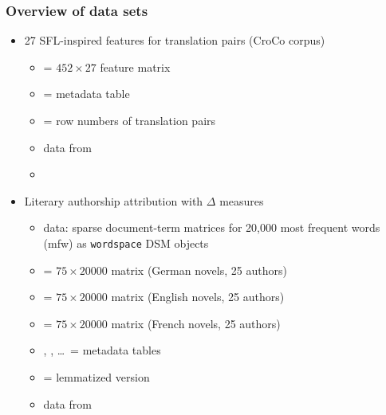 \documentclass[t]{beamer} %
\begin{document}
\begin{frame}
  \frametitle{Overview of data sets}

  \begin{itemize}
  \item 27 SFL-inspired features for translation pairs (CroCo corpus)
    \begin{itemize}
    \item {} = $452\times 27$ feature matrix
    \item {} = metadata table
    \item {} = row numbers of translation pairs
    \item data from \citet{Evert:Neumann:16}
    \item[]
    \end{itemize}
  \item Literary authorship attribution with $\Delta$ measures
    \begin{itemize}
    \item data: sparse document-term matrices for 20,000 most frequent words (mfw) as \texttt{wordspace} DSM objects
    \item {} = $75\times 20000$ matrix (German novels, 25 authors)
    \item {} = $75\times 20000$ matrix (English novels, 25 authors)
    \item {} = $75\times 20000$ matrix (French novels, 25 authors)
    \item {}, , \ldots\ = metadata tables
    \item {} = lemmatized version
    \item data from \citet{Jannidis:etc:15,Evert:etc:17}
    \end{itemize}
  \end{itemize}  
\end{frame}
\end{document}
